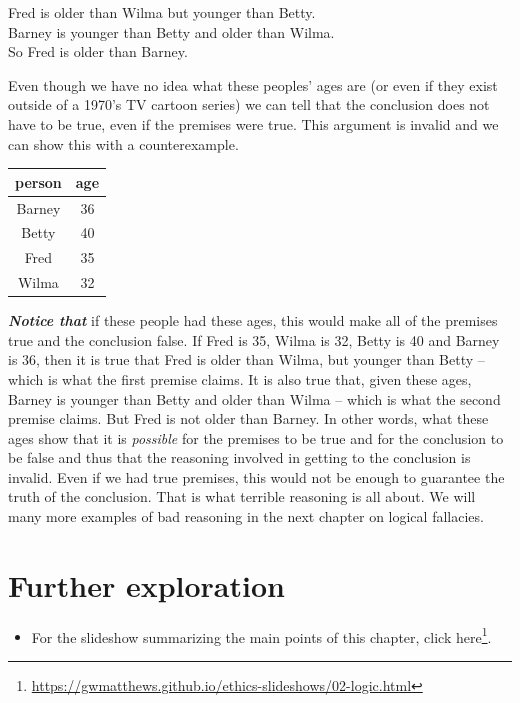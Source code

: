 \documentclass[12pt, openany]{book}
\providecommand{\tightlist}{%
  \setlength{\itemsep}{0pt}\setlength{\parskip}{0pt}}
\renewcommand{\href}[2]{#2\footnote{\url{#1}}}
\begin{document}
\begin{center}

\begin{argument}

Fred is older than Wilma but younger than Betty.\\
Barney is younger than Betty and older than Wilma.\\

So Fred is older than Barney.

\end{argument}

\end{center}

Even though we have no idea what these peoples' ages are (or even if they exist outside of a 1970's TV cartoon series) we can tell that the conclusion does not have to be true, even if the premises were true. This argument is invalid and we can show this with a counterexample.

\begin{longtable}[]{@{}cc@{}}
\toprule
person & age\tabularnewline
\midrule
\endhead
Barney & 36\tabularnewline
Betty & 40\tabularnewline
Fred & 35\tabularnewline
Wilma & 32\tabularnewline
\bottomrule
\end{longtable}

\textbf{\emph{Notice that}} if these people had these ages, this would make all of the premises true and the conclusion false. If Fred is 35, Wilma is 32, Betty is 40 and Barney is 36, then it is true that Fred is older than Wilma, but younger than Betty -- which is what the first premise claims. It is also true that, given these ages, Barney is younger than Betty and older than Wilma -- which is what the second premise claims. But Fred is not older than Barney. In other words, what these ages show that it is \emph{possible} for the premises to be true and for the conclusion to be false and thus that the reasoning involved in getting to the conclusion is invalid. Even if we had true premises, this would not be enough to guarantee the truth of the conclusion. That is what terrible reasoning is all about. We will many more examples of bad reasoning in the next chapter on logical fallacies.

\hypertarget{further-exploration-1}{%
\section*{Further exploration}\label{further-exploration-1}}


\begin{itemize}
\tightlist
\item
  For the slideshow summarizing the main points of this chapter, \href{https://gwmatthews.github.io/ethics-slideshows/02-logic.html}{click here}.
\end{itemize}
\end{document}
